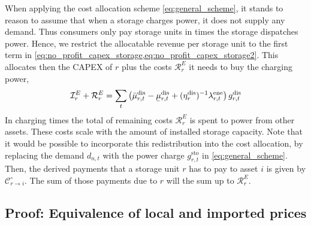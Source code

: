 \documentclass[11pt,twocolumn]{article}
\newcommand{\ubar}[1]{\underaccent{\bar}{#1}}
\newcommand{\storage}{g_{r,t}}
\newcommand{\storagedispatch}{\storage^\text{dis}}
\newcommand{\storagecharge}{\storage^\text{sto}}
\newcommand{\efficiency}{\eta_{r}}
\newcommand{\efficiencydispatch}{\efficiency^\text{dis}}
\newcommand{\mulowerstoragedispatch}{\ubar{\mu}_{r,t}^\text{dis}}
\newcommand{\muupperstoragedispatch}{\bar{\mu}_{r,t}^\text{dis}}
\newcommand{\mustateofcharge}{\lambda^\text{ene}_{r,t}}
\newcommand{\demand}[1][n]{d_{#1,t}}
\newcommand{\cost}[1][\circ]{\mathcal{C}^{#1}}
\newcommand{\capexstorage}{\mathcal{I}^E}
\newcommand{\remainingcost}{\mathcal{R}}
\begin{document}
When applying the cost allocation scheme \cref{eq:general_scheme}, it stands to reason to assume that when a storage charges power, it does not supply any demand. Thus consumers only pay storage units in times the storage dispatches power. Hence, we restrict the allocatable revenue per storage unit to the first term in \cref{eq:no_profit_capex_storage,eq:no_profit_capex_storage2}. This allocates then the CAPEX of $r$ plus the costs $\remainingcost^E_r$ it needs to buy the charging power, 
\begin{align}
        \capexstorage_r + \remainingcost^E_r = \sum_t \left(\muupperstoragedispatch - \mulowerstoragedispatch  + (\efficiencydispatch )^{-1} \mustateofcharge \right) \storagedispatch 
\end{align} 
In charging times the total of remaining costs $\remainingcost^E_r$ is spent to power from other assets. These costs scale with the amount of installed storage capacity.
Note that it would be possible to incorporate this redistribution into the cost allocation, by replacing the demand $\demand$ with the power charge $\storagecharge$ in \cref{eq:general_scheme}. Then, the derived payments that a storage unit $r$ has to pay to asset $i$ is given by $\cost_{r \rightarrow i}$. The sum of those payments due to $r$ will the sum up to $\remainingcost^E_r$. 



\subsection{Proof: Equivalence of local and imported prices}
\label{sec:proof_equivalence}
\end{document}
